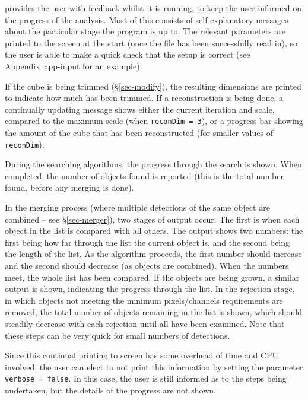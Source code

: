\label{sec-output}


\duchamp provides the user with feedback whilst it is running, to
keep the user informed on the progress of the analysis. Most of this
consists of self-explanatory messages about the particular stage the
program is up to. The relevant parameters are printed to the screen at
the start (once the file has been successfully read in), so the user
is able to make a quick check that the setup is correct (see
Appendix~{app-input} for an example).

If the cube is being trimmed (\S\ref{sec-modify}), the resulting
dimensions are printed to indicate how much has been trimmed. If a
reconstruction is being done, a continually updating message shows
either the current iteration and scale, compared to the maximum scale
(when \texttt{reconDim = 3}), or a progress bar showing the amount of
the cube that has been reconstructed (for smaller values of
\texttt{reconDim}).

During the searching algorithms, the progress through the search is
shown. When completed, the number of objects found is reported (this
is the total number found, before any merging is done).

In the merging process (where multiple detections of the same object
are combined -- see \S\ref{sec-merger}), two stages of output
occur. The first is when each object in the list is compared with all
others. The output shows two numbers: the first being how far through
the list the current object is, and the second being the length of the
list. As the algorithm proceeds, the first number should increase and
the second should decrease (as objects are combined). When the numbers
meet, the whole list has been compared. If the objects are being
grown, a similar output is shown, indicating the progress through the
list. In the rejection stage, in which objects not meeting the minimum
pixels/channels requirements are removed, the total number of objects
remaining in the list is shown, which should steadily decrease with
each rejection until all have been examined. Note that these steps can
be very quick for small numbers of detections.

Since this continual printing to screen has some overhead of time and
CPU involved, the user can elect to not print this information by
setting the parameter \texttt{verbose = false}. In this case, the user
is still informed as to the steps being undertaken, but the details of
the progress are not shown.

